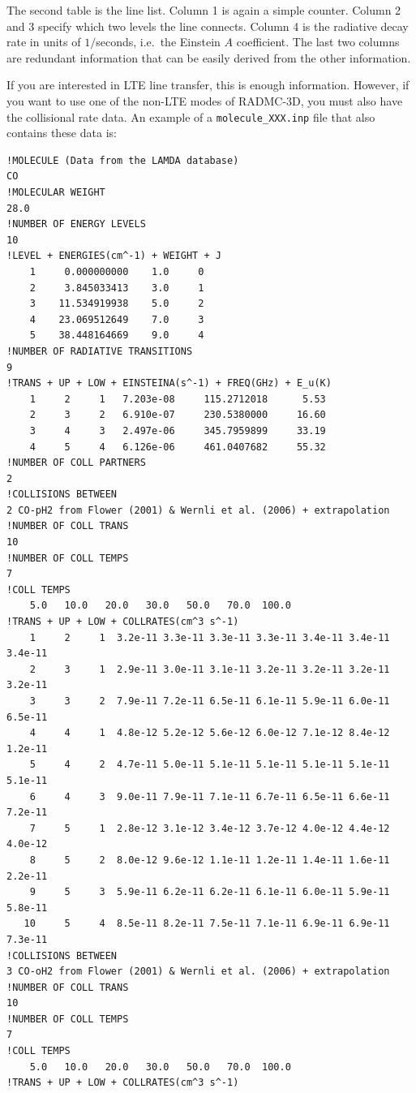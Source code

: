 \documentclass{report}
\newenvironment{asciibox}%
  {\begin{list}{}{%
    \setlength{\topsep}{0.5em}%
    \setlength{\parskip}{0em}%
    \setlength{\parsep}{0em}%
    \setlength{\itemsep}{0em}%
    \setlength{\rightmargin}{0em}%
    \setlength{\leftmargin}{3.0em}%
    \setlength{\labelsep}{1em}%
    \setlength{\labelwidth}{2em}%
  }\normalfont\footnotesize\item}
  {\end{list}}
\begin{document}
The second table is the line list. Column 1 is again a simple counter.
Column 2 and 3 specify which two levels the line connects. Column 4 is the
radiative decay rate in units of $1/$seconds, i.e.\ the Einstein $A$
coefficient. The last two columns are redundant information that can 
be easily derived from the other information.

If you are interested in LTE line transfer, this is enough information.
However, if you want to use one of the non-LTE modes of RADMC-3D, you must
also have the collisional rate data. An example of a {\small\tt molecule\_XXX.inp}
file that also contains these data is:
\begin{asciibox}\begin{verbatim}
!MOLECULE (Data from the LAMDA database)
CO
!MOLECULAR WEIGHT
28.0
!NUMBER OF ENERGY LEVELS
10
!LEVEL + ENERGIES(cm^-1) + WEIGHT + J
    1     0.000000000	 1.0	 0
    2     3.845033413	 3.0	 1
    3    11.534919938	 5.0	 2
    4    23.069512649	 7.0	 3
    5    38.448164669	 9.0	 4
!NUMBER OF RADIATIVE TRANSITIONS
9
!TRANS + UP + LOW + EINSTEINA(s^-1) + FREQ(GHz) + E_u(K)
    1     2     1   7.203e-08     115.2712018      5.53
    2     3     2   6.910e-07     230.5380000     16.60
    3     4     3   2.497e-06     345.7959899     33.19
    4     5     4   6.126e-06     461.0407682     55.32
!NUMBER OF COLL PARTNERS
2
!COLLISIONS BETWEEN
2 CO-pH2 from Flower (2001) & Wernli et al. (2006) + extrapolation
!NUMBER OF COLL TRANS
10
!NUMBER OF COLL TEMPS
7
!COLL TEMPS
    5.0   10.0   20.0   30.0   50.0   70.0  100.0  
!TRANS + UP + LOW + COLLRATES(cm^3 s^-1)
    1     2     1  3.2e-11 3.3e-11 3.3e-11 3.3e-11 3.4e-11 3.4e-11 3.4e-11
    2     3     1  2.9e-11 3.0e-11 3.1e-11 3.2e-11 3.2e-11 3.2e-11 3.2e-11 
    3     3     2  7.9e-11 7.2e-11 6.5e-11 6.1e-11 5.9e-11 6.0e-11 6.5e-11 
    4     4     1  4.8e-12 5.2e-12 5.6e-12 6.0e-12 7.1e-12 8.4e-12 1.2e-11 
    5     4     2  4.7e-11 5.0e-11 5.1e-11 5.1e-11 5.1e-11 5.1e-11 5.1e-11 
    6     4     3  9.0e-11 7.9e-11 7.1e-11 6.7e-11 6.5e-11 6.6e-11 7.2e-11 
    7     5     1  2.8e-12 3.1e-12 3.4e-12 3.7e-12 4.0e-12 4.4e-12 4.0e-12 
    8     5     2  8.0e-12 9.6e-12 1.1e-11 1.2e-11 1.4e-11 1.6e-11 2.2e-11 
    9     5     3  5.9e-11 6.2e-11 6.2e-11 6.1e-11 6.0e-11 5.9e-11 5.8e-11 
   10     5     4  8.5e-11 8.2e-11 7.5e-11 7.1e-11 6.9e-11 6.9e-11 7.3e-11 
!COLLISIONS BETWEEN
3 CO-oH2 from Flower (2001) & Wernli et al. (2006) + extrapolation
!NUMBER OF COLL TRANS
10
!NUMBER OF COLL TEMPS
7
!COLL TEMPS
    5.0   10.0   20.0   30.0   50.0   70.0  100.0
!TRANS + UP + LOW + COLLRATES(cm^3 s^-1)

\end{verbatim}
\end{asciibox}
\end{document}
